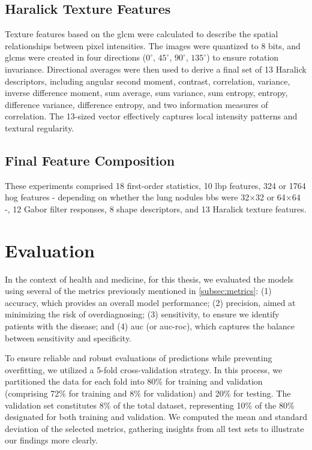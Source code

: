 \subsection*{Haralick Texture Features}

Texture features based on the \ac{glcm} were calculated to describe the spatial relationships between pixel intensities. The images were quantized to 8 bits, and \ac{glcm}s were created in four directions ($0^\circ$, $45^\circ$, $90^\circ$, $135^\circ$) to ensure rotation invariance. Directional averages were then used to derive a final set of 13 Haralick descriptors, including angular second moment, contrast, correlation, variance, inverse difference moment, sum average, sum variance, sum entropy, entropy, difference variance, difference entropy, and two information measures of correlation. The 13-sized vector effectively captures local intensity patterns and textural regularity.

\subsection*{Final Feature Composition}

These experiments comprised 18 first-order statistics, 10 \ac{lbp} features, 324 or 1764 \ac{hog} features - depending on whether the lung nodules \acp{bb} were 32×32 or 64×64 -, 12 Gabor filter responses, 8 shape descriptors, and 13 Haralick texture features.


\section{Evaluation}
In the context of health and medicine, for this thesis, we evaluated the models using several of the metrics previously mentioned in \ref{subsec:metrics}: (1) accuracy, which provides an overall model performance; (2) precision, aimed at minimizing the risk of overdiagnosing; (3) sensitivity, to ensure we identify patients with the disease; and (4) \ac{auc} (or \ac{auc-roc}), which captures the balance between sensitivity and specificity.

To ensure reliable and robust evaluations of predictions while preventing overfitting, we utilized a 5-fold cross-validation strategy.
In this process, we partitioned the data for each fold into 80\% for training and validation (comprising 72\% for training and 8\% for validation) and 20\% for testing. The validation set constitutes 8\% of the total dataset, representing 10\% of the 80\% designated for both training and validation.
We computed the mean and standard deviation of the selected metrics, gathering insights from all test sets to illustrate our findings more clearly.

